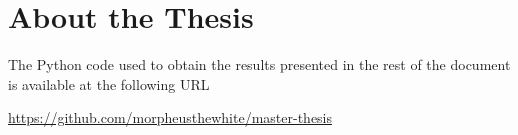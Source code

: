 \section{About the Thesis}
\label{sec:about-thesis}

The Python code used to obtain the results presented in the rest of the
document is available at the following URL

\begin{center}
	\url{https://github.com/morpheusthewhite/master-thesis}
\end{center}
